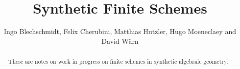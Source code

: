 \documentclass{../util/zariski-small}
\title{Synthetic Finite Schemes}
\theoremstyle{break}
\begin{document}
\author{Ingo Blechschmidt, Felix Cherubini, Matthias Hutzler, Hugo Moeneclaey and David Wärn}

\maketitle

\begin{abstract}
  These are notes on work in progress on finite schemes in synthetic algebraic geometry.
\end{abstract} 




\printbibliography
\end{document}
